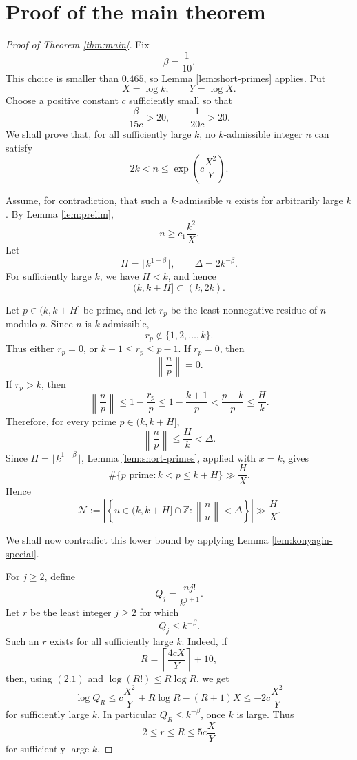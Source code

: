\documentclass[11pt]{article}
\newcommand{\ZZ}{\mathbb Z}
\begin{document}
\section{Proof of the main theorem}

\begin{proof}[Proof of Theorem \ref{thm:main}]
Fix
\[
        \beta=\frac1{10}.
\]
This choice is smaller than \(0.465\), so Lemma \ref{lem:short-primes} applies.
Put
\[
        X=\log k,
        \qquad
        Y=\log X .
\]
Choose a positive constant \(c\) sufficiently small so that
\[
        \frac{\beta}{15c}>20,
        \qquad
        \frac{1}{20c}>20 .
        \tag{C}
\]
We shall prove that, for all sufficiently large \(k\), no \(k\)-admissible
integer \(n\) can satisfy
\[
        2k<n\le
        \exp\!\left(c\frac{X^2}{Y}\right).
        \tag{2.1}
\]

Assume, for contradiction, that such a \(k\)-admissible \(n\) exists for
arbitrarily large \(k\). By Lemma \ref{lem:prelim},
\[
        n\ge c_1\frac{k^2}{X}.
        \tag{2.2}
\]
Let
\[
        H=\lfloor k^{1-\beta}\rfloor,
        \qquad
        \Delta=2k^{-\beta} .
\]
For sufficiently large \(k\), we have \(H<k\), and hence
\[
        (k,k+H]\subset(k,2k).
\]

Let \(p\in(k,k+H]\) be prime, and let \(r_p\) be the least nonnegative residue
of \(n\) modulo \(p\). Since \(n\) is \(k\)-admissible,
\[
        r_p\notin\{1,2,\ldots,k\}.
\]
Thus either \(r_p=0\), or \(k+1\le r_p\le p-1\). If \(r_p=0\), then
\[
        \left\|\frac np\right\|=0 .
\]
If \(r_p>k\), then
\[
        \left\|\frac np\right\|
        \le
        1-\frac{r_p}{p}
        \le
        1-\frac{k+1}{p}
        <
        \frac{p-k}{p}
        \le
        \frac{H}{k} .
\]
Therefore, for every prime \(p\in(k,k+H]\),
\[
        \left\|\frac np\right\|\le \frac{H}{k}<\Delta .
\]
Since \(H=\lfloor k^{1-\beta}\rfloor\), Lemma \ref{lem:short-primes}, applied
with \(x=k\), gives
\[
        \#\{p\text{ prime}:k<p\le k+H\}
        \gg
        \frac{H}{X}.
\]
Hence
\[
        \mathcal N
        :=
        \left|
        \left\{
        u\in(k,k+H]\cap\ZZ:
        \left\|\frac nu\right\|<\Delta
        \right\}
        \right|
        \gg
        \frac{H}{X}.
        \tag{2.3}
\]

We shall now contradict this lower bound by applying Lemma
\ref{lem:konyagin-special}.

For \(j\ge2\), define
\[
        Q_j=\frac{n j!}{k^{j+1}} .
\]
Let \(r\) be the least integer \(j\ge2\) for which
\[
        Q_j\le k^{-\beta}.
        \tag{2.4}
\]
Such an \(r\) exists for all sufficiently large \(k\). Indeed, if
\[
        R=\left\lceil \frac{4cX}{Y}\right\rceil+10,
\]
then, using \((2.1)\) and \(\log(R!)\le R\log R\), we get
\[
        \log Q_R
        \le
        c\frac{X^2}{Y}+R\log R-(R+1)X
        \le
        -2c\frac{X^2}{Y}
\]
for sufficiently large \(k\). In particular \(Q_R\le k^{-\beta}\), once
\(k\) is large. Thus
\[
        2\le r\le R\le 5c\frac{X}{Y}
        \tag{2.5}
\]
for sufficiently large \(k\).


\end{proof}
\end{document}
